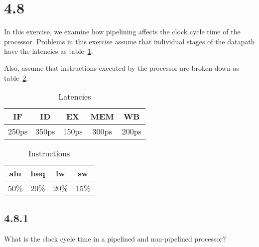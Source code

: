 \documentclass[paper=a4, fontsize=11pt]{scrartcl} %
\begin{document}
\maketitle %

\section{4.8}
\begin{fancyquotes}
    In this exercise, we examine how pipelining affects the clock cycle time of the processor. Problems in this exercise assume that individual stages of the datapath have the latencies as table~\ref{tab:latencies}.

    Also, assume that instructions executed by the processor are broken down as table~\ref{tab:instructions}.
\end{fancyquotes}

\begin{table}[hp]
    \caption{Latencies}\label{tab:latencies}
    \begin{center}
        \begin{tabular}{ccccc}
        \toprule
        \textbf{IF} & \textbf{ID} & \textbf{EX} & \textbf{MEM} & \textbf{WB} \\
        \midrule
        250ps & 350ps & 150ps & 300ps & 200ps \\
        \bottomrule
        \end{tabular}
    \end{center}
\end{table}

\begin{table}[hp]
    \caption{Instructions}\label{tab:instructions}
    \begin{center}
        \begin{tabular}{cccc}
        \toprule
        \textbf{alu} & \textbf{beq} & \textbf{lw} & \textbf{sw} \\
        \midrule
        50\% & 20\% & 20\% & 15\% \\
        \bottomrule
        \end{tabular}
    \end{center}
\end{table}


\subsection{4.8.1}
\begin{fancyquotes}
    What is the clock cycle time in a pipelined and non-pipelined processor?
\end{fancyquotes}
\end{document}
